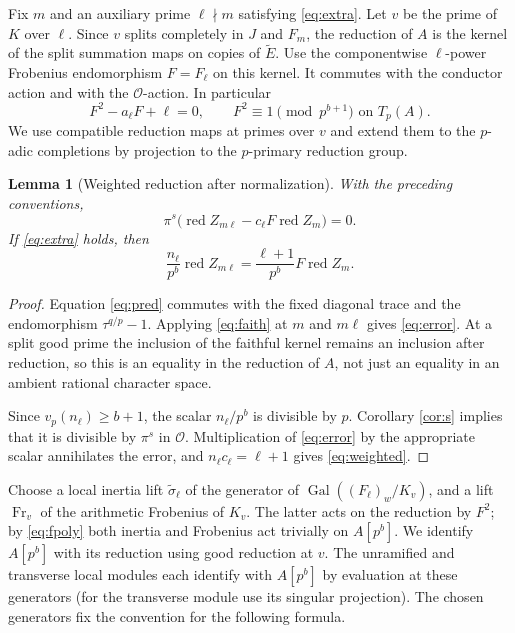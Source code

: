 \documentclass[11pt]{article}
\newtheorem{lemma}[theorem]{Lemma}
\theoremstyle{definition}\newtheorem{definition}[theorem]{Definition}
\theoremstyle{remark}\newtheorem{remark}[theorem]{Remark}
\newcommand{\OO}{\mathcal O}\newcommand{\Tr}{\operatorname{Tr}}
\newcommand{\Gal}{\operatorname{Gal}}\newcommand{\Res}{\operatorname{Res}}
\newcommand{\red}{\operatorname{red}}\newcommand{\ord}{\operatorname{ord}}
\newcommand{\Frob}{\operatorname{Fr}}\newcommand{\HH}{\mathrm H}
\begin{document}
Fix $m$ and an auxiliary prime $\ell\nmid m$ satisfying \eqref{eq:extra}. Let $v$ be the prime of $K$ over $\ell$. Since $v$ splits completely in $J$ and $F_m$, the reduction of $A$ is the kernel of the split summation maps on copies of $\widetilde E$. Use the componentwise $\ell$-power Frobenius endomorphism $F=F_\ell$ on this kernel. It commutes with the conductor action and with the $\OO$-action. In particular
\begin{equation}\label{eq:fpoly}
 F^2-a_\ell F+\ell=0,
 \qquad F^2\equiv1\pmod{p^{b+1}}\text{ on }T_p(A).
\end{equation}
We use compatible reduction maps at primes over $v$ and extend them to the $p$-adic completions by projection to the $p$-primary reduction group.

\begin{lemma}[Weighted reduction after normalization]\label{lem:weighted}
With the preceding conventions,
\begin{equation}\label{eq:error}
 \pi^s\bigl(\red Z_{m\ell}-c_\ell F\red Z_m\bigr)=0.
\end{equation}
If \eqref{eq:extra} holds, then
\begin{equation}\label{eq:weighted}
 \frac{n_\ell}{p^b}\red Z_{m\ell}
 =\frac{\ell+1}{p^b}F\red Z_m.
\end{equation}
\end{lemma}
\begin{proof}
Equation \eqref{eq:pred} commutes with the fixed diagonal trace and the endomorphism $\tau^{q/p}-1$. Applying \eqref{eq:faith} at $m$ and $m\ell$ gives \eqref{eq:error}. At a split good prime the inclusion of the faithful kernel remains an inclusion after reduction, so this is an equality in the reduction of $A$, not just an equality in an ambient rational character space.

Since $v_p(n_\ell)\ge b+1$, the scalar $n_\ell/p^b$ is divisible by $p$. Corollary \ref{cor:s} implies that it is divisible by $\pi^s$ in $\OO$. Multiplication of \eqref{eq:error} by the appropriate scalar annihilates the error, and $n_\ell c_\ell=\ell+1$ gives \eqref{eq:weighted}.
\end{proof}

Choose a local inertia lift $\widetilde\sigma_\ell$ of the generator of $\Gal((F_\ell)_w/K_v)$, and a lift $\Frob_v$ of the arithmetic Frobenius of $K_v$. The latter acts on the reduction by $F^2$; by \eqref{eq:fpoly} both inertia and Frobenius act trivially on $A[p^b]$. We identify $A[p^b]$ with its reduction using good reduction at $v$. The unramified and transverse local modules each identify with $A[p^b]$ by evaluation at these generators (for the transverse module use its singular projection). The chosen generators fix the convention for the following formula.
\end{document}

